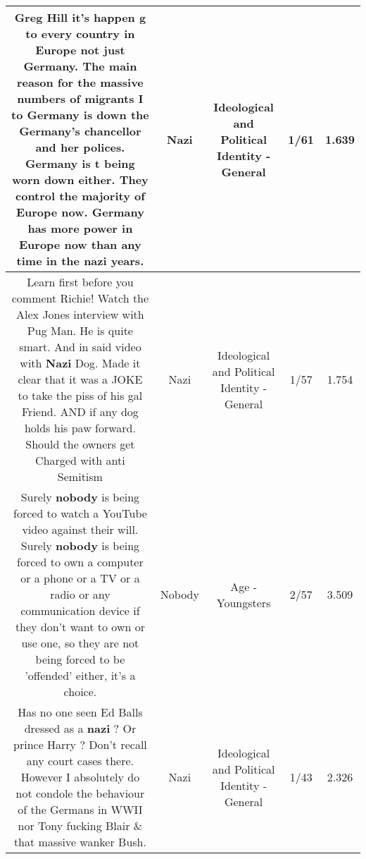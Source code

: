 \documentclass[11pt]{article}
\newlength\mylength
\begin{document}
\begin{center}
\begin{longtable}{|C{.65\mylength}|C{.30\mylength}|C{.12\mylength}|C{.12\mylength}|C{.12\mylength}|}
  \small Greg Hill it's happen g to every country in Europe not just Germany. The main reason for the massive numbers of migrants I to Germany is down the Germany's chancellor and her polices. Germany is t being worn down either. They control the majority of Europe now. Germany has more power in Europe now than any time in the \textbf{nazi} years.\normalsize   & Nazi &  Ideological and Political Identity - General & 1/61 & 1.639 \\  \hline
  \small Learn first before you comment Richie!  Watch the Alex Jones interview with Pug Man.  He is quite smart. And in said video with \textbf{Nazi} Dog. Made it clear that it was a JOKE to take the piss of his gal Friend.   AND if any dog holds his paw forward. Should  the owners get Charged with anti Semitism\normalsize   & Nazi &  Ideological and Political Identity - General & 1/57 & 1.754 \\  \hline
  \small Surely \textbf{nobody} is being forced to watch a YouTube video against their will. Surely \textbf{nobody} is being forced to own a computer or a phone or a TV or a radio or any communication device if they don't want to own or use one, so they are not being forced to be 'offended' either, it's a choice.\normalsize   & Nobody & Age - Youngsters & 2/57 & 3.509 \\  \hline
  \small Has no one seen Ed Balls dressed as a \textbf{nazi} ? Or prince Harry ? Don't recall any court cases there. However I absolutely do not condole the behaviour of the Germans in WWII nor Tony fucking Blair \& that massive wanker Bush.\normalsize   & Nazi &  Ideological and Political Identity - General & 1/43 & 2.326 \\  \hline
  
\end{longtable}
\end{center}
\end{document}

